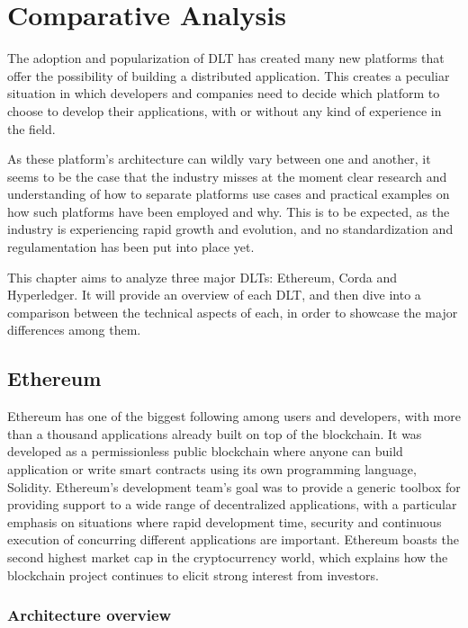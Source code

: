 \chapter{Comparative Analysis}
\label{chap:comparative-analysis}

The adoption and popularization of DLT has created many new platforms that offer the possibility of building a distributed application.
This creates a peculiar situation in which developers and companies need to decide which platform to choose to develop their applications, with or without any kind of experience in the field.

As these platform's architecture can wildly vary between one and another, it seems to be the case that the industry misses at the moment clear research and understanding of how to separate platforms use cases and practical examples on how such platforms have been employed and why. This is to be expected, as the industry is experiencing rapid growth and evolution, and no standardization and regulamentation has been put into place yet.

This chapter aims to analyze three major DLTs: Ethereum, Corda and Hyperledger. It will provide an overview of each DLT, and then dive into a comparison between the technical aspects of each, in order to showcase the major differences among them.

\section{Ethereum}

Ethereum has one of the biggest following among users and developers, with more than a thousand applications already built on top of the blockchain. It was developed as a permissionless public blockchain where anyone can build application or write smart contracts using its own programming language, Solidity. Ethereum's development team's goal was to provide a generic toolbox for providing support to a wide range of decentralized applications, with a particular emphasis on situations where rapid development time, security and continuous execution of concurring different applications are important.
Ethereum boasts the second highest market cap in the cryptocurrency world, which explains how the blockchain project continues to elicit strong interest from investors.

\subsection{Architecture overview}

